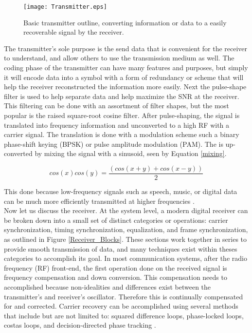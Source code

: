 \begin{figure}[!ht]\label{fig:Transmitter_System_Diagram}
\centering
\texttt{[image: Transmitter.eps]}
\caption{Basic transmitter outline, converting information or data to a easily recoverable signal by the receiver.}
\end{figure}

The transmitter's sole purpose is the send data that is convenient for the receiver to understand, and allow others to use the transmission medium as well.  The coding phase of the transmitter can have many features and purposes, but simply it will encode data into a symbol with a form of redundancy or scheme that will help the receiver reconstructed the information more easily.  Next the pulse-shape filter is used to help separate data and help maximize the SNR at the receiver.  This filtering can be done with an assortment of filter shapes, but the most popular is the raised square-root cosine filter.  After pulse-shaping, the signal is translated into frequency information and unconverted to a high RF with a carrier signal.  The translation is done with a modulation scheme such a binary phase-shift keying (BPSK) or pulse amplitude modulation (PAM).  The is up-converted by mixing the signal with a sinusoid, seen by Equation \eqref{mixing}.

\begin{equation}[!ht]\label{mixing}
cos(x)cos(y)=\frac{(cos(x+y)+cos(x-y))}{2}
\end{equation}

This done because low-frequency signals such as speech, music, or digital data can be much more efficiently transmitted at higher frequencies \cite{9}.\\

Now let us discuss the receiver.  At the system level, a modern digital receiver can be broken down into a small set of distinct categories or operations: carrier synchronization, timing synchronization, equalization, and frame synchronization, as outlined in Figure \ref{Receiver_Blocks}.  These sections work together in series to provide smooth transmission of data, and many techniques exist within theses categories to accomplish its goal.  In most communication systems, after the radio frequency (RF) front-end, the first operation done on the received signal is frequency compensation and down conversion.  This compensation needs to accomplished because non-idealities and differences exist between the transmitter's and receiver's oscillator.  Therefore this is continually compensated for and corrected.  Carrier recovery can be accomplished using several methods that include but are not limited to: squared difference loops, phase-locked loops, costas loops, and decision-directed phase tracking \cite{9}.\\

